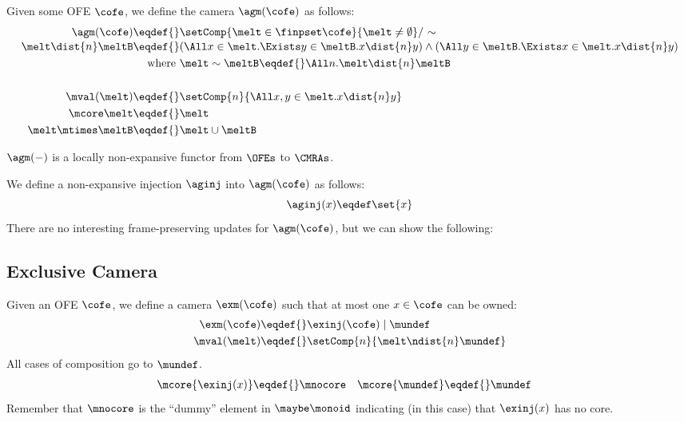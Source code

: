 Given some OFE $\cofe$, we define the camera $\agm(\cofe)$ as follows:
\begin{align*}
  \agm(\cofe) \eqdef{}& \setComp{\melt \in \finpset\cofe}{\melt \neq \emptyset} /\ {\sim} \\[-0.2em]
  \melt \dist{n} \meltB \eqdef{}& (\All x \in \melt. \Exists y \in \meltB. x \dist{n} y) \land (\All y \in \meltB. \Exists x \in \melt. x \dist{n} y) \\
  \textnormal{where }& \melt \sim \meltB \eqdef{} \All n. \melt \dist{n} \meltB  \\
~\\
  \mval(\melt) \eqdef{}& \setComp{n}{ \All x, y \in \melt. x \dist{n} y } \\
  \mcore\melt \eqdef{}& \melt \\
  \melt \mtimes \meltB \eqdef{}& \melt \cup \meltB
\end{align*}

$\agm(-)$ is a locally non-expansive functor from $\OFEs$ to $\CMRAs$.

We define a non-expansive injection $\aginj$ into $\agm(\cofe)$ as follows:
\[ \aginj(x) \eqdef \set{x} \]
There are no interesting frame-preserving updates for $\agm(\cofe)$, but we can show the following:
\begin{mathpar}

  
\end{mathpar}


\subsection{Exclusive Camera}

Given an OFE $\cofe$, we define a camera $\exm(\cofe)$ such that at most one $x \in \cofe$ can be owned:
\begin{align*}
  \exm(\cofe) \eqdef{}& \exinj(\cofe) \mid \mundef \\
  \mval(\melt) \eqdef{}& \setComp{n}{\melt \ndist{n} \mundef}
\end{align*}
All cases of composition go to $\mundef$.
\begin{align*}
  \mcore{\exinj(x)} \eqdef{}& \mnocore &
  \mcore{\mundef} \eqdef{}& \mundef
\end{align*}
Remember that $\mnocore$ is the ``dummy'' element in $\maybe\monoid$ indicating (in this case) that $\exinj(x)$ has no core.

